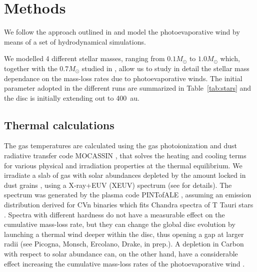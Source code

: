 \documentclass{aa}
\begin{document}
\section{Methods}
We follow the approach outlined in  and model the photoevaporative wind by means of a set of hydrodynamical simulations.

We modelled 4 different stellar masses, ranging from $0.1 M_\odot$ to $1.0 M_\odot$ which, together with the $0.7 M_\odot$ studied in , allow us to study in detail the stellar mass dependance on the mass-loss rates due to photoevaporative winds.
The initial parameter adopted in the different runs are summarized in Table~\ref{tab:stars} and the disc is initially extending out to \SI{400}{au}.

\subsection{Thermal calculations}
The gas temperatures are calculated using the gas photoionization and dust radiative transfer code \textsc{MOCASSIN} , that solves the heating and cooling terms for various physical and irradiation properties at the thermal equilibrium.
We irradiate a slab of gas with solar abundances  depleted by the amount locked in dust grains \citep{1996ApJ...470..893S}, using a X-ray+EUV (XEUV) spectrum (see  for details).
The spectrum was generated by the plasma code PINTofALE , assuming an emission distribution derived for CVn binaries  which fits Chandra spectra of T Tauri stars .
Spectra with different hardness do not have a measurable effect on the cumulative mass-loss rate, but they can change the global disc evolution by launching a thermal wind deeper within the disc, thus opening a gap at larger radii (see Picogna, Monsch, Ercolano, Drake, in prep.).
A depletion in Carbon with respect to solar abundance can, on the other hand, have a considerable effect increasing the cumulative mass-loss rates of the photoevaporative wind .
\end{document}
